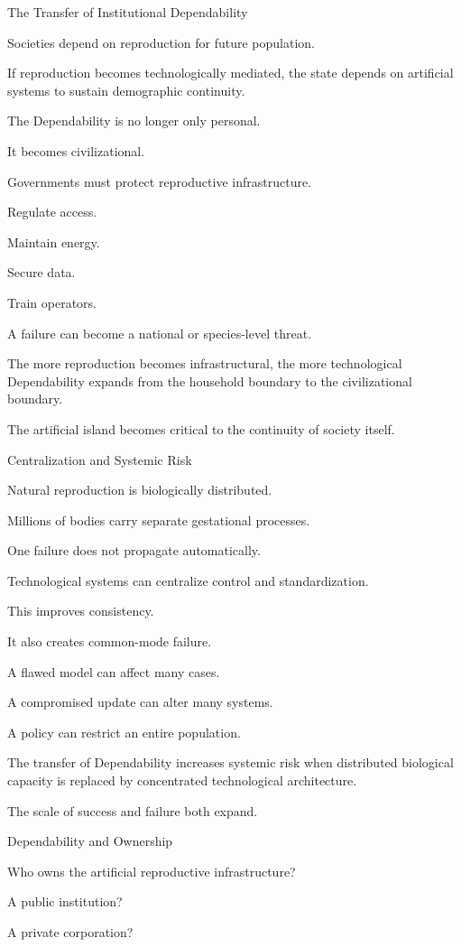 The Transfer of Institutional Dependability

Societies depend on reproduction for future population.

If reproduction becomes technologically mediated, the state depends on artificial systems to sustain demographic continuity.

The Dependability is no longer only personal.

It becomes civilizational.

Governments must protect reproductive infrastructure.

Regulate access.

Maintain energy.

Secure data.

Train operators.

A failure can become a national or species-level threat.

The more reproduction becomes infrastructural, the more technological Dependability expands from the household boundary to the civilizational boundary.

The artificial island becomes critical to the continuity of society itself.

Centralization and Systemic Risk

Natural reproduction is biologically distributed.

Millions of bodies carry separate gestational processes.

One failure does not propagate automatically.

Technological systems can centralize control and standardization.

This improves consistency.

It also creates common-mode failure.

A flawed model can affect many cases.

A compromised update can alter many systems.

A policy can restrict an entire population.

The transfer of Dependability increases systemic risk when distributed biological capacity is replaced by concentrated technological architecture.

The scale of success and failure both expand.

Dependability and Ownership

Who owns the artificial reproductive infrastructure?

A public institution?

A private corporation?

